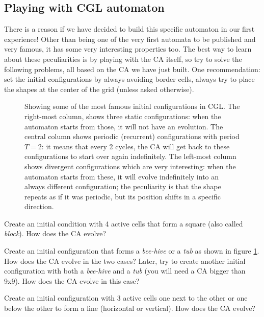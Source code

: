 \subsection{Playing with CGL automaton}
There is a reason if we have decided to build this specific automaton in our first experience!
Other than being one of the very first automata to be published and very famous,
it has some very interesting properties too.
The best way to learn about these peculiarities is by playing with the CA itself, so try to
solve the following problems, all based on the CA we have just built. One recommendation:
set the initial configurations by always avoiding border cells, always try to place
the shapes at the center of the grid (unless asked otherwise).

%
\begin{figure}[b]
\sidecaption

%
%
\caption{Showing some of the most famous initial configurations in CGL.
The right-most column, shows three static configurations: when the automaton starts from those,
it will not have an evolution.
The central column shows periodic (recurrent) configurations with period $T=2$: it means that every
2 cycles, the CA will get back to these configurations to start over again indefinitely.
The left-most column shows divergent configurations which are very interesting: when the
automaton starts from these, it will evolve indefinitely into an always different configuration; the
peculiarity is that the shape repeats as if it was periodic, but its position shifts in a
specific direction.}
\label{fig:cglplay}
\end{figure}
%

\begin{problem}
\label{prob:cgl1}
Create an initial condition with 4 active cells that form a square (also called \textit{block}).
How does the CA evolve?
\end{problem}

\begin{problem}
\label{prob:cgl2}
Create an initial configuration that forms a \textit{bee-hive} or
a \textit{tub} as shown in figure \ref{fig:cglplay}.
How does the CA evolve in the two cases?
Later, try to create another initial configuration with both a
\textit{bee-hive} and a \textit{tub} (you will need a CA bigger than 9x9).
How does the CA evolve in this case?
\end{problem}

\begin{problem}
\label{prob:cgl3}
Create an initial configuration with 3 active cells one next to the other or one
below the other to form a line (horizontal or vertical).
How does the CA evolve?
\end{problem}

